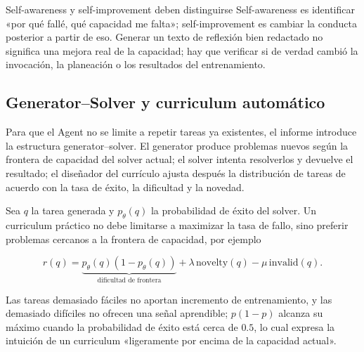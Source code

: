 \begin{importantbox}{Self-awareness y self-improvement deben distinguirse}
Self-awareness es identificar «por qué fallé, qué capacidad me falta»; self-improvement es cambiar la conducta posterior a partir de eso. Generar un texto de reflexión bien redactado no significa una mejora real de la capacidad; hay que verificar si de verdad cambió la invocación, la planeación o los resultados del entrenamiento.
\end{importantbox}



\subsection{Generator--Solver y curriculum automático}

Para que el Agent no se limite a repetir tareas ya existentes, el informe introduce la estructura generator--solver. El generator produce problemas nuevos según la frontera de capacidad del solver actual; el solver intenta resolverlos y devuelve el resultado; el diseñador del currículo ajusta después la distribución de tareas de acuerdo con la tasa de éxito, la dificultad y la novedad.



Sea $q$ la tarea generada y $p_\theta(q)$ la probabilidad de éxito del solver. Un curriculum práctico no debe limitarse a maximizar la tasa de fallo, sino preferir problemas cercanos a la frontera de capacidad, por ejemplo

$$
r(q)=\underbrace{p_\theta(q)(1-p_\theta(q))}_{\text{dificultad de frontera}}
+\lambda\,\mathrm{novelty}(q)-\mu\,\mathrm{invalid}(q).
$$

Las tareas demasiado fáciles no aportan incremento de entrenamiento, y las demasiado difíciles no ofrecen una señal aprendible; $p(1-p)$ alcanza su máximo cuando la probabilidad de éxito está cerca de $0.5$, lo cual expresa la intuición de un curriculum «ligeramente por encima de la capacidad actual».

